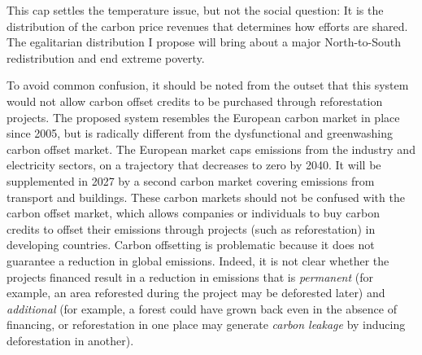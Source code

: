 \documentclass[a5paper,english,openany]{memoir}
\begin{document}
This cap settles the temperature issue, %
but not the social question: It is the distribution of the carbon price revenues %
that determines how efforts are shared. The egalitarian distribution I %
propose will bring about a major North-to-South %
redistribution and end %
extreme poverty. 

To avoid common confusion, it should be noted from the outset that this system would not allow carbon offset credits to be purchased through reforestation projects. The proposed system resembles the European carbon market in place since 2005, but is radically different from the dysfunctional and greenwashing carbon offset market. %
 The European market caps emissions from the industry and electricity sectors, on a trajectory that decreases to zero by 2040. It will be supplemented in 2027 by a second carbon market covering emissions from transport and buildings. These carbon markets should not be confused with the carbon offset market, which allows companies or individuals to buy carbon credits to offset their emissions through projects (such as reforestation) in developing countries. Carbon offsetting is problematic because it does not guarantee a reduction in global emissions. Indeed, it is not clear whether the projects financed result in a reduction in emissions that is \textit{permanent} (for example, an area reforested during the project may be deforested later) and \textit{additional} (for example, a forest could have grown back even in the absence of financing, or reforestation in one place may generate \textit{carbon leakage} by inducing deforestation in another). %
\end{document}
